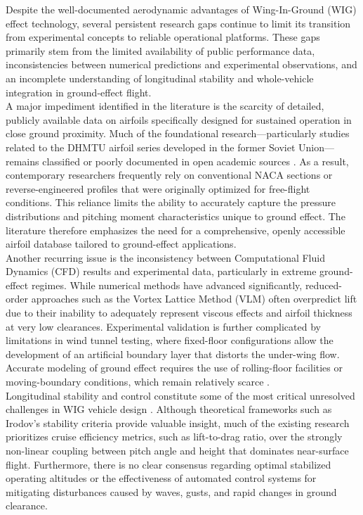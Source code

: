 Despite the well-documented aerodynamic advantages of Wing-In-Ground (WIG) effect technology,
several persistent research gaps continue to limit its transition from experimental concepts to reliable operational platforms. These gaps primarily stem from the limited availability of public performance data, inconsistencies between numerical predictions and experimental observations, and an incomplete understanding of longitudinal stability and whole-vehicle integration in ground-effect flight.\\

\noindent A major impediment identified in the literature is the scarcity of detailed, publicly available
data on airfoils specifically designed for sustained operation in close ground proximity. Much of the foundational research—particularly studies related to the DHMTU airfoil series developed in the former Soviet Union—remains classified or poorly documented in open academic sources \cite{ASME_CFD_simulation}. As a result, contemporary researchers frequently rely on conventional NACA sections or reverse-engineered profiles that were originally optimized for free-flight conditions. This reliance limits the ability to accurately capture the pressure distributions and pitching moment characteristics unique to ground effect. The literature therefore emphasizes the need for a comprehensive, openly accessible airfoil database tailored to ground-effect applications.\\

\noindent Another recurring issue is the inconsistency between Computational Fluid Dynamics (CFD) results
and experimental data, particularly in extreme ground-effect regimes. While numerical methods have advanced significantly, reduced-order approaches such as the Vortex Lattice Method (VLM) often overpredict lift due to their inability to adequately represent viscous effects and airfoil thickness at very low clearances. Experimental validation is further complicated by limitations in wind tunnel testing, where fixed-floor configurations allow the development of an artificial boundary layer that distorts the under-wing flow. Accurate modeling of ground effect requires the use of rolling-floor facilities or moving-boundary conditions, which remain relatively scarce \cite{ASME_CFD_simulation}.\\

\noindent Longitudinal stability and control constitute some of the most critical unresolved challenges
in WIG vehicle design \cite{Longitudinal_stability_study}. Although theoretical frameworks such as Irodov's stability criteria provide valuable insight, much of the existing research prioritizes cruise efficiency metrics,
such as lift-to-drag ratio, over the strongly non-linear coupling between pitch angle and height that dominates near-surface flight. Furthermore, there is no clear consensus regarding optimal stabilized operating altitudes or the effectiveness of automated control systems for mitigating disturbances caused by waves, gusts, and rapid changes in ground clearance.\\

